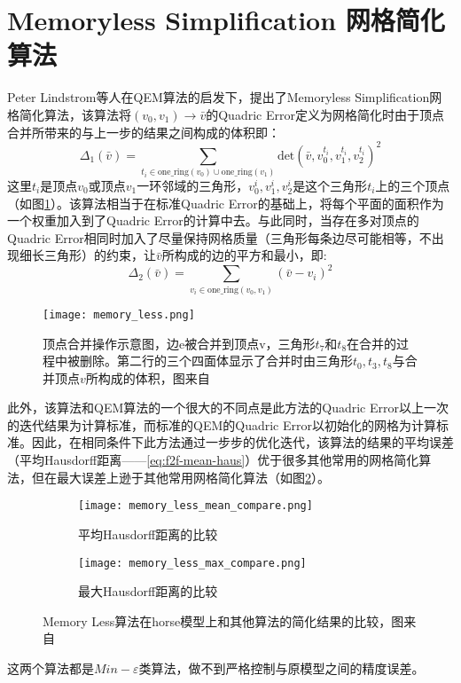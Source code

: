 \section{Memoryless Simplification 网格简化算法}
Peter Lindstrom等人在QEM算法的启发下，提出了Memoryless Simplification网格简化算法\cite{memory-less}，该算法将$(v_0,v_1) \to \bar{v}$的Quadric Error定义为网格简化时由于顶点合并所带来的与上一步的结果之间构成的体积即：
\begin{equation}
  \Delta_1(\bar{v}) = \sum_{t_i \in \text{one\_ring}(v_0) \cup \text{one\_ring}(v_1)} \text{det} (\bar{v},v_0^{t_i},v_1^{t_i},v_2^{t_i})^2
\end{equation}
这里$t_i$是顶点$v_0$或顶点$v_1$一环邻域的三角形，$v_0^i,v_1^i, v_2^i$是这个三角形$t_i$上的三个顶点（如图\ref{fig:memory-less}）。该算法相当于在标准Quadric Error的基础上，将每个平面的面积作为一个权重加入到了Quadric Error的计算中去。与此同时，当存在多对顶点的Quadric Error相同时加入了尽量保持网格质量（三角形每条边尽可能相等，不出现细长三角形）的约束，让$\bar{v}$所构成的边的平方和最小，即:
\begin{equation}
  \Delta_2(\bar{v}) = \sum_{v_i \in \text{one\_ring} (v_0,v_1)} (\bar{v}-v_i)^2
\end{equation}
\begin{figure}[htbp]
    \centering
    \texttt{[image: memory\_less.png]}
    \caption[顶点合并操作]{顶点合并操作示意图，边e被合并到顶点v，三角形$t_7$和$t_8$在合并的过程中被删除。第二行的三个四面体显示了合并时由三角形$t_0,t_3,t_8$与合并顶点$v$所构成的体积，图来自\cite{memory-less}}
    \label{fig:memory-less}
\end{figure}
此外，该算法和QEM算法的一个很大的不同点是此方法的Quadric Error以上一次的迭代结果为计算标准，而标准的QEM的Quadric Error以初始化的网格为计算标准。因此，在相同条件下此方法通过一步步的优化迭代，该算法的结果的平均误差（平均Hausdorff距离——\ref{eq:f2f-mean-haus}）优于很多其他常用的网格简化算法，但在最大误差上逊于其他常用网格简化算法（如图\ref{fig:memory-less-compare}）。
\begin{figure}[htbp]
  \centering
  \begin{subfigure}[b]{0.7\textwidth}
    \texttt{[image: memory\_less\_mean\_compare.png]}
    \caption[input]{平均Hausdorff距离的比较}
    \end{subfigure}
    \begin{subfigure}[b]{0.7\textwidth}
      \texttt{[image: memory\_less\_max\_compare.png]}
      \caption[mls]{最大Hausdorff距离的比较}
    \end{subfigure}
    \caption[Memory Less简化结果]{Memory Less算法在horse模型上和其他算法的简化结果的比较，图来自\cite{memory-less}}
    \label{fig:memory-less-compare}
\end{figure}
这两个算法都是$Min-\varepsilon$类算法，做不到严格控制与原模型之间的精度误差。

